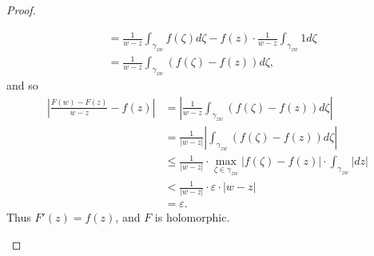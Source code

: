 \documentclass[12pt,openany]{book}
\theoremstyle{definition}
\newcommand{\of}[1]{\left( #1 \right)}
\newcommand{\abs}[1]{\left\lvert #1 \right\rvert}
\begin{document}
\begin{proof}
\begin{enumerate}[(i)]
\begin{align*}
				&=\frac{1}{w-z}\int_{\gamma_{zw}}f\of{\zeta}d\zeta-f\of{z}\cdot\frac{1}{w-z}\int_{\gamma_{zw}}1d\zeta\\
				&=\frac{1}{w-z}\int_{\gamma_{zw}}\of{f\of{\zeta}-f\of{z}}d\zeta,
			\end{align*} and so \begin{align*}
				\abs{\frac{F\of{w}-F\of{z}}{w-z}-f\of{z}}&=\abs{\frac{1}{w-z}\int_{\gamma_{zw}}\of{f\of{\zeta}-f\of{z}}d\zeta}\\
				&=\frac{1}{\abs{w-z}}\abs{\int_{\gamma_{zw}}\of{f\of{\zeta}-f\of{z}}d\zeta}\\
				&\leq\frac{1}{\abs{w-z}}\cdot\max_{\zeta\in\gamma_{zw}}\abs{f\of{\zeta}-f\of{z}}\cdot\int_{\gamma_{zw}}\abs{dz}\\
				&<\frac{1}{\abs{w-z}}\cdot\varepsilon\cdot\abs{w-z}\\
				&=\varepsilon.
			\end{align*} Thus $F'\of{z}=f\of{z}$, and $F$ is holomorphic.
		\end{enumerate}
	\end{proof}
	
	\newpage
\end{document}

